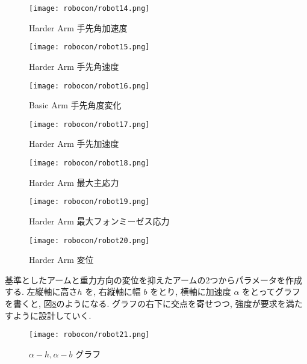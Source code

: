 \documentclass[10pt,b5paper,papersize,dvipdfmx]{jsbook}
\begin{document}
\begin{figure}[H]
  \centering
  \texttt{[image: robocon/robot14.png]}
  \caption{Harder Arm 手先角加速度}
  \label{fig:Harder Arm 手先角加速度}
\end{figure}
\begin{figure}[H]
  \centering
  \texttt{[image: robocon/robot15.png]}
  \caption{Harder Arm 手先角速度}
  \label{fig:Harder Arm 手先角速度}
\end{figure}
\begin{figure}[H]
  \centering
  \texttt{[image: robocon/robot16.png]}
  \caption{Basic Arm 手先角度変化}
  \label{fig:Basic Arm 手先角度変化}
\end{figure}
\begin{figure}[H]
  \centering
  \texttt{[image: robocon/robot17.png]}
  \caption{Harder Arm 手先加速度}
  \label{fig:Harder Arm 手先加速度}
\end{figure}
\begin{figure}[H]
  \centering
  \texttt{[image: robocon/robot18.png]}
  \caption{Harder Arm 最大主応力}
  \label{fig:Harder Arm 最大主応力}
\end{figure}
\begin{figure}[H]
  \centering
  \texttt{[image: robocon/robot19.png]}
  \caption{Harder Arm 最大フォンミーゼス応力}
  \label{fig:Harder Arm 最大フォンミーゼス応力}
\end{figure}
\begin{figure}[H]
  \centering
  \texttt{[image: robocon/robot20.png]}
  \caption{Harder Arm 変位}
  \label{fig:Harder Arm 変位}
\end{figure}
基準としたアームと重力方向の変位を抑えたアームの2つからパラメータを作成する. 左縦軸に高さ$h$ を, 右縦軸に幅 $b$ をとり, 横軸に加速度 $\alpha$ をとってグラフを書くと, 図\ref{fig:alpha-h, alpha-b グラフ}のようになる. グラフの右下に交点を寄せつつ, 強度が要求を満たすように設計していく.
\begin{figure}[H]
  \centering
  \texttt{[image: robocon/robot21.png]}
  \caption{$\alpha-h, \alpha-b$ グラフ}
  \label{fig:alpha-h, alpha-b グラフ}
\end{figure}
\end{document}
